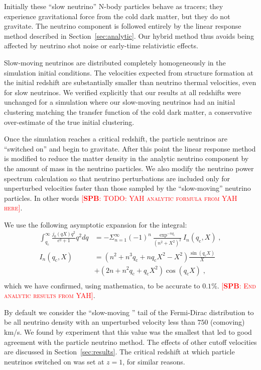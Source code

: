 \documentclass[useAMS, usenatbib]{mnras}
\newcommand{\spb}[1]{{\textsc{\textcolor{red}{[{\bf SPB}: #1]}}}}
\begin{document}
Initially these ``slow neutrino'' N-body particles behave as tracers; they experience gravitational force from the cold dark matter, but they do not gravitate. The neutrino component is followed entirely by the linear response method described 
in Section~\ref{sec:analytic}. Our hybrid method thus avoids being affected by neutrino shot noise or early-time relativistic effects.

Slow-moving neutrinos are distributed completely homogeneously in the simulation initial conditions. The velocities expected from structure formation at the initial redshift are substantially smaller than neutrino thermal velocities, even for slow neutrinos. 
We verified explicitly that our results at all redshifts were unchanged for a simulation where our slow-moving neutrinos had an initial clustering matching the transfer function of the cold dark matter, a conservative over-estimate of the true initial clustering.

Once the simulation reaches a critical redshift, the particle neutrinos are ``switched on'' and begin to gravitate.
After this point the linear response method is modified to reduce the matter density in the analytic neutrino component by the amount of mass in the neutrino particles. We also modify the neutrino power spectrum calculation so that neutrino perturbations are included only for unperturbed velocities faster than those sampled by the ``slow-moving'' neutrino particles. 
In other words \spb{TODO: YAH analytic formula from YAH here}.

We use the following asymptotic expansion for the integral:
\begin{align}
 \int^\infty_{q_\mathrm{c}} \frac{j_0(qX) q^2}{e^q + 1} q^2 dq &= - \Sigma^{\infty}_{n=1} (-1)^n \frac{\exp^{-n q_\mathrm{c}}}{(n^2+X^2)^2} I_n(q_\mathrm{c},X) \;,\\
 I_n(q_\mathrm{c},X) &= (n^2 + n^3 q_\mathrm{c} + n q_\mathrm{c} X^2 - X^2) \frac{\sin(q_\mathrm{c} X)}{X} \\
 &+ (2n + n^2 q_\mathrm{c} + q_\mathrm{c} X^2) \cos(q_\mathrm{c} X)\;,\\
\end{align}
which we have confirmed, using mathematica, to be accurate to $0.1\%$.
\spb{End analytic results from YAH}.

By default we consider the ``slow-moving '' tail of the Fermi-Dirac distribution to be all neutrino density with an unperturbed velocity less than $750$ (comoving) km/s. We found by experiment that this value was the smallest that led to good agreement 
with the particle neutrino method. The effects of other cutoff velocities are discussed in Section~\ref{sec:results}.
The critical redshift at which particle neutrinos switched on was set at $z=1$, for similar reasons.
\end{document}
